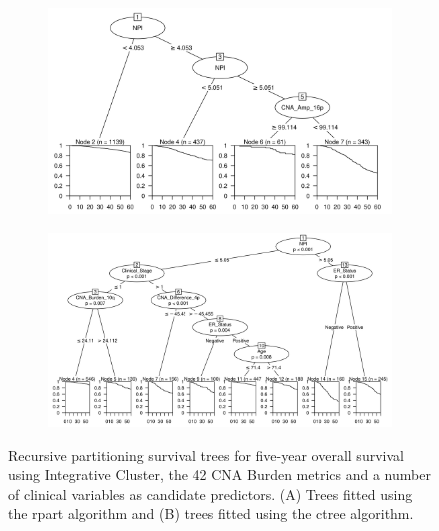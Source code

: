 \begin{figure}[!htb]
\centering

\vspace{1cm}

\begin{subfigure}{\textwidth}
\subcaption{}
\includegraphics[width=1\textwidth]{../figures/Appendices/Appendix_B/Clin_PA_PartyKit_Survival_Burden_FiveYearOS_INTCLUST.png}
\end{subfigure}

\vspace{2cm}

\begin{subfigure}{\textwidth}
\subcaption{}
\includegraphics[width=1\textwidth]{../figures/Appendices/Appendix_B/Clin_PA_Ctree_Survival_Burden_FiveYearOS_INTCLUST.png}
\end{subfigure}

\vspace{1cm}

\caption[Recursive partitioning survival trees for five-year overall survival using Integrative Cluster, the 42 CNA Burden metrics and a number of clinical variables as candidate predictors.]{Recursive partitioning survival trees for five-year overall survival using Integrative Cluster, the 42 CNA Burden metrics and a number of clinical variables as candidate predictors. (A) Trees fitted using the rpart algorithm and (B) trees fitted using the ctree algorithm.}
\end{figure}

